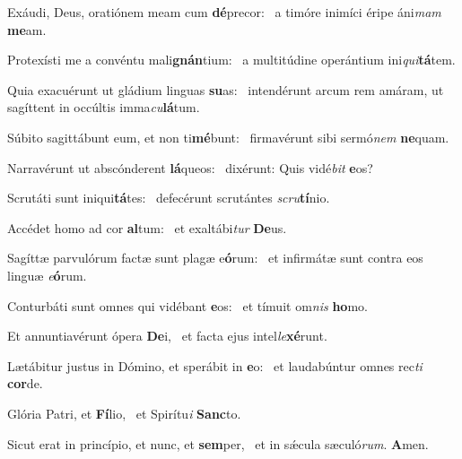 \item Exáudi, Deus, oratiónem meam cum \textbf{dé}precor:~\psstar{} a timóre inimíci éripe áni\textit{mam} \textbf{me}am.
\item Protexísti me a convéntu mali\textbf{gnán}tium:~\psstar{} a multitúdine operántium ini\textit{qui}\textbf{tá}tem.
\item Quia exacuérunt ut gládium linguas \textbf{su}as:~\psstar{} intendérunt arcum rem amáram, ut sagíttent in occúltis imma\textit{cu}\textbf{lá}tum.
\item Súbito sagittábunt eum, et non ti\textbf{mé}bunt:~\psstar{} firmavérunt sibi sermó\textit{nem} \textbf{ne}quam.
\item Narravérunt ut abscónderent \textbf{lá}queos:~\psstar{} dixérunt: Quis vidé\textit{bit} \textbf{e}os?
\item Scrutáti sunt iniqui\textbf{tá}tes:~\psstar{} defecérunt scrutántes \textit{scru}\textbf{tí}nio.
\item Accédet homo ad cor \textbf{al}tum:~\psstar{} et exaltábi\textit{tur} \textbf{De}us.
\item Sagíttæ parvulórum factæ sunt plagæ e\textbf{ó}rum:~\psstar{} et infirmátæ sunt contra eos linguæ \textit{e}\textbf{ó}rum.
\item Conturbáti sunt omnes qui vidébant \textbf{e}os:~\psstar{} et tímuit om\textit{nis} \textbf{ho}mo.
\item Et annuntiavérunt ópera \textbf{De}i,~\psstar{} et facta ejus intel\textit{le}\textbf{xé}runt.
\item Lætábitur justus in Dómino, et sperábit in \textbf{e}o:~\psstar{} et laudabúntur omnes rec\textit{ti} \textbf{cor}de.
\item Glória Patri, et \textbf{Fí}lio,~\psstar{} et Spirítu\textit{i} \textbf{Sanc}to.
\item Sicut erat in princípio, et nunc, et \textbf{sem}per,~\psstar{} et in sǽcula sæculó\textit{rum}. \textbf{A}men.